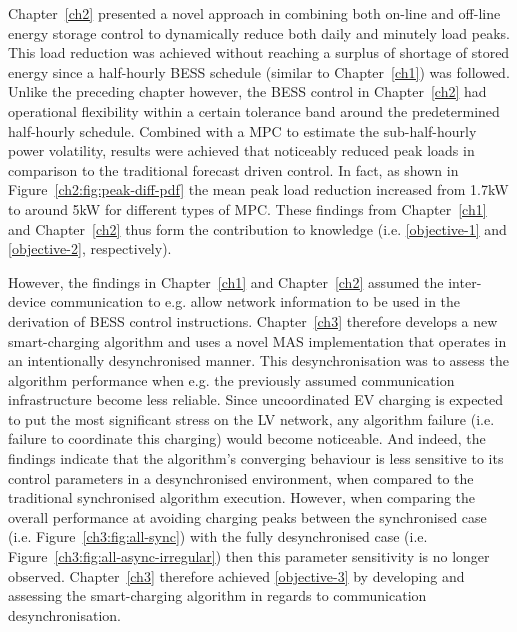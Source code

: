 Chapter~\ref{ch2} presented a novel approach in combining both on-line and off-line energy storage control to dynamically reduce both daily and minutely load peaks.
This load reduction was achieved without reaching a surplus of shortage of stored energy since a half-hourly BESS schedule (similar to Chapter~\ref{ch1}) was followed.
Unlike the preceding chapter however, the BESS control in Chapter~\ref{ch2} had operational flexibility within a certain tolerance band around the predetermined half-hourly schedule.
Combined with a MPC to estimate the sub-half-hourly power volatility, results were achieved that noticeably reduced peak loads in comparison to the traditional forecast driven control.
In fact, as shown in Figure~\ref{ch2:fig:peak-diff-pdf} the mean peak load reduction increased from 1.7kW to around 5kW for different types of MPC.
These findings from Chapter~\ref{ch1} and Chapter~\ref{ch2} thus form the contribution to knowledge (i.e. \ref{objective-1} and \ref{objective-2}, respectively).

However, the findings in Chapter~\ref{ch1} and Chapter~\ref{ch2} assumed the inter-device communication to e.g. allow network information to be used in the derivation of BESS control instructions.
Chapter~\ref{ch3} therefore develops a new smart-charging algorithm and uses a novel MAS implementation that operates in an intentionally desynchronised manner.
This desynchronisation was to assess the algorithm performance when e.g. the previously assumed communication infrastructure become less reliable.
Since uncoordinated EV charging is expected to put the most significant stress on the LV network, any algorithm failure (i.e. failure to coordinate this charging) would become noticeable.
And indeed, the findings indicate that the algorithm's converging behaviour is less sensitive to its control parameters in a desynchronised environment, when compared to the traditional synchronised algorithm execution.
However, when comparing the overall performance at avoiding charging peaks between the synchronised case (i.e. Figure~\ref{ch3:fig:all-sync}) with the fully desynchronised case (i.e. Figure~\ref{ch3:fig:all-async-irregular}) then this parameter sensitivity is no longer observed.
Chapter~\ref{ch3} therefore achieved \ref{objective-3} by developing and assessing the smart-charging algorithm in regards to communication desynchronisation.

